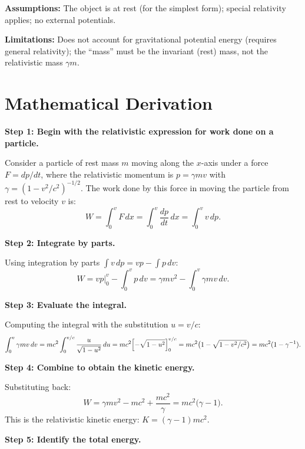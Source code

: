 \textbf{Assumptions:} The object is at rest (for the simplest form); special relativity applies; no external potentials.


\textbf{Limitations:} Does not account for gravitational potential energy (requires general relativity); the ``mass'' must be the invariant (rest) mass, not the relativistic mass $\gamma m$.


\section*{Mathematical Derivation}

\textbf{Step 1: Begin with the relativistic expression for work done on a particle.}

Consider a particle of rest mass $m$ moving along the $x$-axis under a force $F = dp/dt$, where the relativistic momentum is $p = \gamma mv$ with $\gamma = (1-v^{2}/c^{2})^{-1/2}$. The work done by this force in moving the particle from rest to velocity $v$ is:
\begin{equation}
W = \int_{0}^{v} F\,dx = \int_{0}^{v} \frac{dp}{dt}\,dx = \int_{0}^{v} v\,dp.
\end{equation}

\textbf{Step 2: Integrate by parts.}

Using integration by parts $\int v\,dp = vp - \int p\,dv$:
\begin{equation}
W = vp\Big|_{0}^{v} - \int_{0}^{v} p\,dv = \gamma mv^{2} - \int_{0}^{v} \gamma mv\,dv.
\end{equation}

\textbf{Step 3: Evaluate the integral.}

Computing the integral with the substitution $u = v/c$:
\begin{equation}
\int_{0}^{v} \gamma mv\,dv = mc^{2}\int_{0}^{v/c} \frac{u}{\sqrt{1-u^{2}}}\,du = mc^{2}\Bigl[-\sqrt{1-u^{2}}\Bigr]_{0}^{v/c} = mc^{2}\bigl(1-\sqrt{1-v^{2}/c^{2}}\bigr) = mc^{2}(1-\gamma^{-1}).
\end{equation}

\textbf{Step 4: Combine to obtain the kinetic energy.}

Substituting back:
\begin{equation}
W = \gamma mv^{2} - mc^{2} + \frac{mc^{2}}{\gamma} = mc^{2}\bigl(\gamma - 1\bigr).
\end{equation}
This is the relativistic kinetic energy: $K = (\gamma - 1)mc^{2}$.

\textbf{Step 5: Identify the total energy.}

